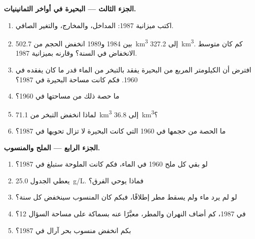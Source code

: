 \begin{problem}
\medskip
\noindent\textbf{الجزء الثالث --- البحيرة في أواخر الثمانينيات.}
\begin{enumerate}[resume]
  \item اكتب ميزانية 1987: المداخل، والمخارج، والتغير الصافي.
  \item بين 1984 و1989 انخفض الحجم من \qty{502.7}{km^3} إلى
        \qty{327.2}{km^3}. كم كان متوسط الانخفاض في السنة؟ وقارنه
        بميزانية 1987.
  \item افترض أن الكيلومتر المربع من البحيرة يفقد بالتبخر من الماء قدر ما كان
        يفقده في 1960. فكم كانت مساحة البحيرة في 1987؟
  \item ما حصة ذلك من مساحتها في 1960؟
  \item لماذا انخفض التبخر من \qty{71.1}{km^3} إلى
        \qty{36.8}{km^3}؟
  \item ما الحصة من حجمها في 1960 التي كانت البحيرة لا تزال تحويها في 1987؟
\end{enumerate}

\medskip
\noindent\textbf{الجزء الرابع --- الملح والمنسوب.}
\begin{enumerate}[resume]
  \item لو بقي كل ملح 1960 في الماء، فكم كانت الملوحة
        ستبلغ في 1987؟
  \item يعطي الجدول \qty{25.0}{g/L}. فماذا يوحي الفرق؟
  \item لو لم يرد ماء ولم يسقط مطر إطلاقًا، فبكم كان المنسوب سينخفض
        كل سنة؟
  \item في 1987، كم أضاف النهران والمطر، معبَّرًا عنه بسماكة
        على مساحة السؤال 12؟
  \item بكم انخفض منسوب بحر آرال في 1987؟
\end{enumerate}
\end{problem}
